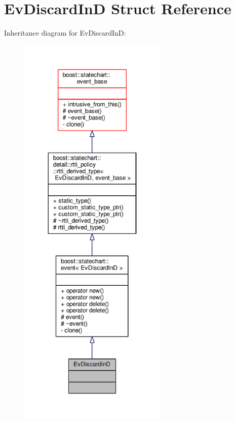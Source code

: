 \hypertarget{struct_ev_discard_in_d}{}\section{Ev\+Discard\+InD Struct Reference}
\label{struct_ev_discard_in_d}


Inheritance diagram for Ev\+Discard\+InD\+:
\nopagebreak
\begin{figure}[H]
\begin{center}
\leavevmode
\includegraphics[height=550pt]{struct_ev_discard_in_d__inherit__graph}
\end{center}
\end{figure}


